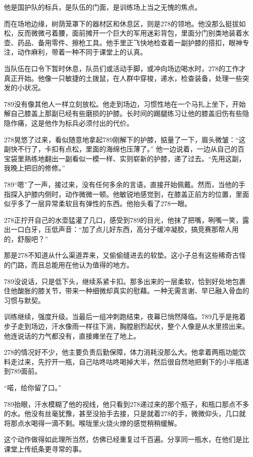 \documentclass[a4paper]{book}
\begin{document}
他是国护队的标兵，是队伍的门面，是训练场上当之无愧的焦点。

而在场地边缘，树荫笼罩下的器材区和休息区，则是278的领地。他没那么挺拔如松，反而微微弓着腰，面前摊开一个巨大的军用迷彩背包，里面分门别类地装着水壶、药品、备用零件、擦枪工具。他手里正飞快地检查着一副护膝的搭扣，眼神专注，动作麻利，带着一种不同于课堂上的认真。

当队伍在口令下暂时休息，队员们或活动手脚，或冲向场边喝水时，278的工作才真正开始。他像一只敏捷的土拨鼠，在人群中穿梭，递水，检查装备，处理一些突发的小状况。

789没有像其他人一样立刻放松。他走到场边，习惯性地在一个马扎上坐下，开始解自己膝盖上那副已经有些磨损的护膝。长时间的踢腿练习让他的膝盖旧伤有些隐隐作痛，这是他作为标兵必须付出的代价。

278晃悠了过来，看似随意地拿起789刚解下的护膝，掂量了一下，眉头微皱：“这副快不行了，卡扣有点松，里面的海绵也压薄了。” 他一边说着，一边从自己的百宝袋里熟练地翻出一副看似一模一样、实则崭新的护膝，递了过去。“先用这副，我晚上把旧的修修。”

789“嗯”了一声，接过来，没有任何多余的言语，直接开始佩戴。然而，当他的手指探入护膝内侧时，动作微微一顿。他敏锐地感觉到，在膝盖正前方的位置，里面似乎多了一层异常柔软且有弹性的东西。他抬头看了278一眼。

278正拧开自己的水壶猛灌了几口，感受到789的目光，他抹了把嘴，咧嘴一笑，露出一口白牙，压低声音：“加了点儿好东西，高分子缓冲凝胶，搞竞赛那帮人用的，舒服吧？”

那是278不知道从什么渠道弄来，又偷偷缝进去的软垫。这小子总有这些稀奇古怪的门路，而且总能用在他认为值得的地方。

789没说话，只是低下头，继续系紧卡扣。那多出来的一层柔软，恰到好处地包裹住他酸胀的膝关节，带来一种细微却真实的慰藉。一种无需言谢、早已融入骨血的习惯与默契。

训练继续，强度升级。当最后一组冲刺跑结束，夜幕已悄然降临。789几乎是拖着步子走到场边，汗水像雨一样往下淌，胸膛剧烈起伏，整个人像是从水里捞出来。他连说话的力气都没有，直接瘫坐在了地上。

278的情况好不少，他主要负责后勤保障，体力消耗没那么大。他拿着两瓶功能饮料走过来，先拧开一瓶，自己咕咚咕咚喝掉大半，然后很自然地把剩下的小半瓶递到789面前。

“喏，给你留了口。”

789抬眼，汗水模糊了他的视线，他只看到278递过来的那个瓶子，和瓶口那点不多的水。他没有丝毫犹豫，甚至没抬手去接，只是就着278的手，微微仰头，几口就将那点水喝得一滴不剩。喉咙里火烧火燎的感觉稍稍缓解。

这个动作做得如此理所当然，仿佛已经重复过千百遍。分享同一瓶水，在他们是比课堂上传纸条更寻常的事。
\end{document}
